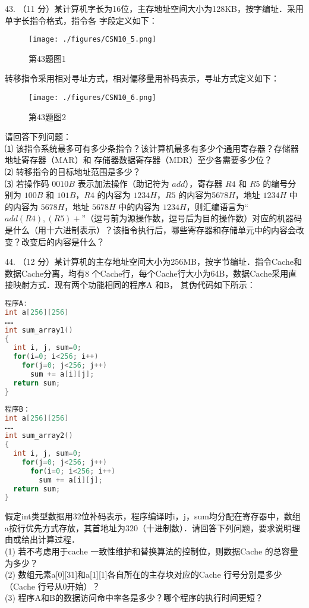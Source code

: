 43. （11 分）某计算机字长为16位，主存地址空间大小为128KB，按字编址．采用单字长指令格式，指令各
字段定义如下： \\
\begin{figure}[ht]
\centering
\texttt{[image: ./figures/CSN10\_5.png]}
\caption{第43题图1} \label{CSN10_fig5}
\end{figure}
转移指令采用相对寻址方式，相对偏移量用补码表示，寻址方式定义如下： \\
\begin{figure}[ht]
\centering
\texttt{[image: ./figures/CSN10\_6.png]}
\caption{第43题图2} \label{CSN10_fig6}
\end{figure}

请回答下列问题： \\
⑴ 该指令系统最多可有多少条指令？该计算机最多有多少个通用寄存器？存储器地址寄存器（MAR）和
存储器数据寄存器（MDR）至少各需要多少位？ \\
⑵ 转移指令的目标地址范围是多少？ \\
⑶ 若操作码 $0010B$ 表示加法操作（助记符为 $add$），寄存器 $R4$ 和 $R5$ 的编号分别为 $100B$ 和 $101B$，$R4$ 的内容为 $1234H$，$R5$ 的内容为5$678H$，地址 $1234H$ 中的内容为 $5678H$，地址 $5678H$ 中的内容为 $1234H$，则汇编语言为“$add (R4), (R5)+$”（逗号前为源操作数，逗号后为目的操作数）对应的机器码是什么（用十六进制表示）？该指令执行后，哪些寄存器和存储单元中的内容会改变？改变后的内容是什么？

44. （12 分）某计算机的主存地址空间大小为256MB，按字节编址．指令Cache和数据Cache分离，均有8
个Cache行，每个Cache行大小为64B，数据Cache采用直接映射方式．现有两个功能相同的程序A 和B，
其伪代码如下所示： \\
\begin{lstlisting}[language=cpp]
程序A:
int a[256][256]
……
int sum_array1()
{
  int i, j, sum=0;
  for(i=0; i<256; i++)
    for(j=0; j<256; j++)
      sum += a[i][j];
  return sum;
}
\end{lstlisting}

\begin{lstlisting}[language=cpp]
程序B：
int a[256][256]
……
int sum_array2()
{
  int i, j, sum=0;
    for(j=0; j<256; j++)
      for(i=0; i<256; i++)
        sum += a[i][j];
  return sum;
}
\end{lstlisting}

假定int类型数据用32位补码表示，程序编译时i，j，sum均分配在寄存器中，数组a按行优先方式存放，其首地址为320（十进制数）．请回答下列问题，要求说明理由或给出计算过程． \\
(1) 若不考虑用于cache 一致性维护和替换算法的控制位，则数据Cache 的总容量为多少？ \\
(2) 数组元素a[0][31]和a[1][1]各自所在的主存块对应的Cache 行号分别是多少（Cache 行号从0开始）？ \\
(3) 程序A和B的数据访问命中率各是多少？哪个程序的执行时间更短？

